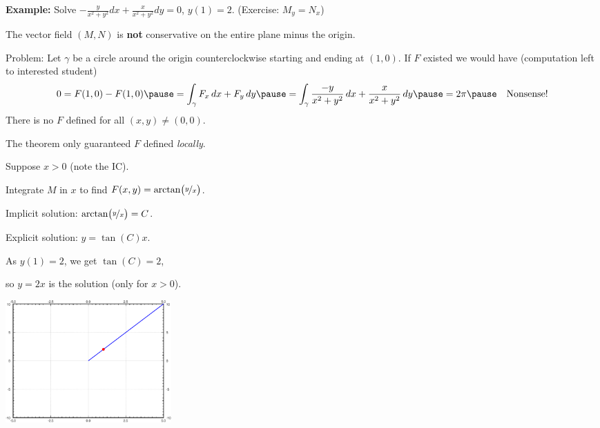 \documentclass[10pt,aspectratio=169]{beamer}
\begin{document}
\begin{frame}

\textbf{Example:}
Solve
\quad
$\displaystyle
-\frac{y}{x^2+y^2} dx + \frac{x}{x^2+y^2} dy = 0$, \quad $y(1) = 2$.
\qquad
\pause
(Exercise: $M_y = N_x$)

\medskip
\pause

The vector field
$(M,N)$ is \textbf{not} conservative on the entire plane minus the origin.

\pause
Problem: Let $\gamma$ be a circle around the origin counterclockwise
starting and ending at $(1,0)$.  If $F$ existed we would have
(computation left to interested student)
\[
0 = F(1,0) - F(1,0) \pause = \int_\gamma F_x \, dx + F_y \, dy \pause = \int_\gamma \frac{-y}{x^2+y^2} \, dx +
\frac{x}{x^2+y^2} \, dy \pause = 2\pi 
\pause
\quad
\text{Nonsense!}
\]
\pause
There is no $F$ defined for all $(x,y) \not= (0,0)$.

\medskip
\pause

The theorem only guaranteed $F$ defined \emph{locally}.

\medskip
\pause

Suppose $x > 0$ (note the IC).

\pause
Integrate $M$ in $x$ to find
\quad $F(x,y) = \operatorname{arctan} \bigl( \nicefrac{y}{x} \bigr)$.

\pause
Implicit solution:
\quad
$\operatorname{arctan} \bigl( \nicefrac{y}{x} \bigr) = C$.

\pause
Explicit solution: \quad  $y = \tan(C) x$.

\pause
As $y(1)=2$, we get $\tan(C) = 2$,

so \quad $y=2x$ \quad is the solution (only for $x > 0$).

\vspace*{-1.65in}
\hfill
\includegraphics[width=2.5in]{../figures/exact-y2x}

\end{frame}
\end{document}
